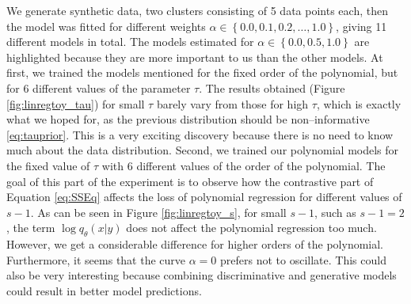 We generate synthetic data, two clusters consisting of 5 data points each, then the model was fitted for different weights $\alpha \in \left\{0.0, 0.1, 0.2,\dots,1.0\right\}$, giving 11 different models in total. The models estimated for $\alpha \in \left\{0.0, 0.5, 1.0 \right\}$ are highlighted because they are more important to us than the other models.
At first, we trained the models mentioned for the fixed order of the polynomial, but for 6 different values of the parameter $\tau$. The results obtained (Figure \ref{fig:linregtoy_tau}) for small $\tau$ barely vary from those for high $\tau$, which is exactly what we hoped for, as the previous distribution should be non--informative \eqref{eq:tauprior}.  This is a very exciting discovery because there is no need to know much about the data distribution. Second, we trained our polynomial models for the fixed value of $\tau$ with 6 different values of the order of the polynomial. The goal of this part of the experiment is to observe how the contrastive part of Equation \eqref{eq:SSEq} affects the loss of polynomial regression for different values of $s-1$. As can be seen in Figure \ref{fig:linregtoy_s}, for small $s-1$, such as $s-1 = 2$, the term $\log q_{\theta}\left(x|y\right)$ does not affect the polynomial regression too much. However, we get a considerable difference for higher orders of the polynomial. Furthermore, it seems that the curve $\alpha = 0$ prefers not to oscillate. This could also be very interesting because combining discriminative and generative models could result in better model predictions.    

